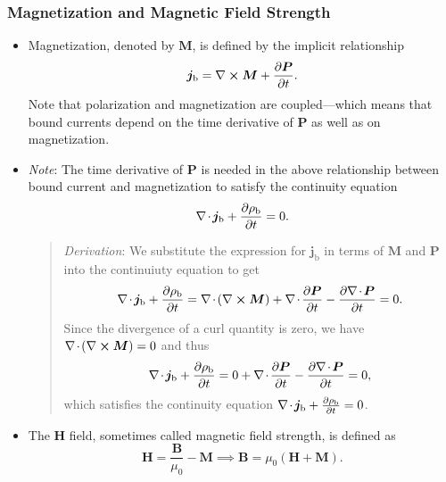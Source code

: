 \documentclass[11pt, a4paper]{article}
\renewcommand{\vec}[1]{\bm{#1}} %
\newcommand{\B}{\vec{B}} %
\renewcommand{\H}{\vec{H}}  %
\renewcommand{\P}{\vec{P}}  %
\newcommand{\M}{\vec{M}}  %
\newcommand{\mm}{\mu_{0}}  %
\renewcommand{\j}{\vec{j}}  %
\renewcommand{\div}{\nabla \mspace{-2mu} \cdot \mspace{-2mu}}
\renewcommand{\curl}{\nabla \cross}
\begin{document}
\subsubsection{Magnetization and Magnetic Field Strength}
\begin{itemize}
    \item Magnetization, denoted by $ \M $, is defined by the implicit relationship
	\begin{equation*}
		\j_{\text{b}} = \curl \M + \pdv{\P}{t}.
	\end{equation*}
	Note that polarization and magnetization are coupled---which means that bound currents depend on the time derivative of $ \P $ as well as on magnetization. 
	
	\item \textit{Note}: The time derivative of $ \P $ is needed in the above relationship between bound current and magnetization to satisfy the continuity equation
    \begin{equation*}
        \div \j_{\text{b}} + \pdv{\rho_{\text{b}}}{t} = 0.
    \end{equation*}
    \begin{quote}
        \textit{Derivation}: We substitute the expression for $ \j_{\text{b}} $ in terms of $ \M $ and $ \P $ into the continuiuty equation to get
        \begin{equation*}
            \div \j_{\text{b}} + \pdv{\rho_{\text{b}}}{t} = \div (\curl \M) + \div \pdv{\P}{t} - \pdv{\div \P}{t} = 0.
        \end{equation*}
        Since the divergence of a curl quantity is zero, we have $ \div (\curl \M) = 0 $ and thus
        \begin{equation*}
            \div \j_{\text{b}} + \pdv{\rho_{\text{b}}}{t} = 0 + \div \pdv{\P}{t} - \pdv{\div \P}{t} = 0,
        \end{equation*}
        which satisfies the continuity equation $ \div \j_{\text{b}} + \pdv{\rho_{\text{b}}}{t} = 0 $. 
    \end{quote}
    
    \item The $ \H $ field, sometimes called magnetic field strength, is defined as
    \begin{equation*}
        \H = \frac{\B}{\mm} - \M \implies \B = \mm (\H + \M).
    \end{equation*}
    
\end{itemize}
\end{document}
